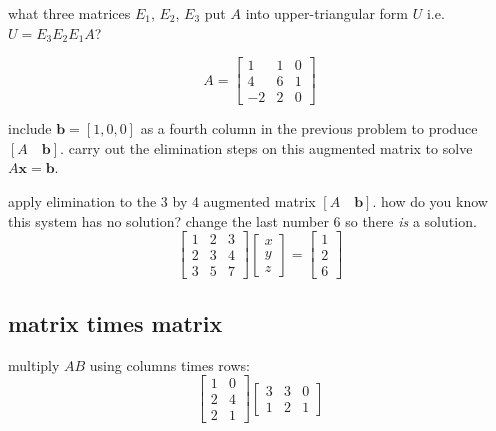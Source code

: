 \documentclass[addpoints]{exam}
\begin{document}
\begin{questions}
\question what three matrices $E_1$, $E_2$, $E_3$ put $A$ into upper-triangular form $U$ i.e. $U=E_3E_2E_1 A$? 

\begin{equation*}
	A=\begin{bmatrix}
	1 & 1 & 0  \\
	4 & 6 & 1 \\
	-2 & 2 & 0 
	\end{bmatrix}
\end{equation*}

\question include $\mathbf{b}=[1, 0, 0]$ as a fourth column in the previous problem to produce $[A \quad \mathbf{b}]$. carry out the elimination steps on this augmented matrix to solve $A\mathbf{x}=\mathbf{b}$.

\question apply elimination to the 3 by 4 augmented matrix $[A \quad \mathbf{b}]$. how do you know this system has no solution? change the last number 6 so there \emph{is} a solution.
\begin{equation*}
	\begin{bmatrix}
	1 & 2 & 3  \\
	2 & 3 & 4 \\
	3 & 5 & 7
	\end{bmatrix}
	\begin{bmatrix}
	 x \\
	 y\\
	 z
	\end{bmatrix}
	= 
	\begin{bmatrix}
	 1 \\
	 2 \\
	 6
	\end{bmatrix}
\end{equation*}


\subsection*{matrix times matrix}
\question multiply $AB$ using columns times rows:
\begin{equation*}
	\begin{bmatrix}
	1 & 0  \\
	2 & 4 \\
	2 & 1
	\end{bmatrix}
	\begin{bmatrix}
	3 & 3 & 0  \\
	1 & 2 & 1 
	\end{bmatrix}
\end{equation*}


\end{questions}
\end{document}
